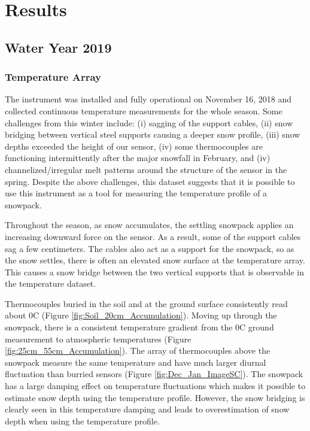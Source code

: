 \chapter{Results}
\section{Water Year 2019} 
\subsection{Temperature Array}
The instrument was installed and fully operational on November 16, 2018 and collected continuous temperature measurements for the whole season. Some challenges from this winter include: (i) sagging of the support cables, (ii) snow bridging between vertical steel supports causing a deeper snow profile, (iii) snow depths exceeded the height of our sensor, (iv) some thermocouples are functioning intermittently after the major snowfall in February, and (iv) channelized/irregular melt patterns around the structure of the sensor in the spring. Despite the above challenges, this dataset suggests that it is possible to use this instrument as a tool for measuring the temperature profile of a snowpack. 

Throughout the season, as snow accumulates, the settling snowpack applies an increasing downward force on the sensor. As a result, some of the support cables sag a few centimeters. The cables also act as a support for the snowpack, so as the snow settles, there is often an elevated snow surface at the temperature array. This causes a snow bridge between the two vertical supports that is observable in the temperature dataset.   

Thermocouples buried in the soil and at the ground surface consistently read about 0\textdegree C (Figure \ref{fig:Soil_20cm_Accumulation}). Moving up through the snowpack, there is a consistent temperature gradient from the 0\textdegree C ground measurement to atmospheric temperatures (Figure \ref{fig:25cm_55cm_Accumulation}). The array of thermocouples above the snowpack measure the same temperature and have much larger diurnal fluctuation than burried sensors (Figure \ref{fig:Dec_Jan_ImageSC}). The snowpack has a large damping effect on temperature fluctuations which makes it possible to estimate snow depth using the temperature profile. However, the snow bridging is clearly seen in this temperature damping and leads to overestimation of snow depth when using the temperature profile. 

